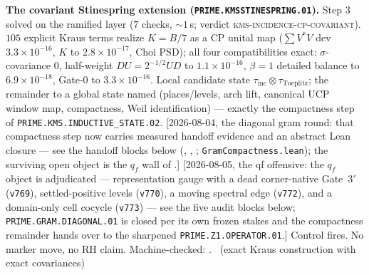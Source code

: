 \par\smallskip\noindent\textbf{The covariant Stinespring extension
(\texttt{PRIME.KMSSTINESPRING.01}).}
Step 3 solved on the ramified layer ($7$ checks, ${\sim}1$\,s;
verdict \textsc{kms-incidence-cp-covariant}).  $105$ explicit Kraus
terms realize $K=B/7$ as a CP unital map ($\sum V^*V$ dev
$3.3\times10^{-16}$, $K$ to $2.8\times10^{-17}$, Choi PSD); all
four compatibilities exact: $\sigma$-covariance $0$, half-weight
$DU=2^{-1/2}UD$ to $1.1\times10^{-16}$, $\beta=1$ detailed balance
to $6.9\times10^{-18}$, Gate-0 to $3.3\times10^{-16}$.  Local
candidate state
$\tau_{\mathrm{inc}}\otimes\tau_{\mathrm{Toeplitz}}$; the remainder
to a global state named (places/levels, arch lift, canonical UCP
window map, compactness, Weil identification) --- exactly the
compactness step of \texttt{PRIME.KMS.INDUCTIVE\_STATE.02}.
[2026-08-04, the diagonal gram round: that compactness step now
carries measured handoff evidence and an abstract Lean closure ---
see the handoff blocks below
(,
,
;
\texttt{GramCompactness.lean}); the surviving open object is the
$q_f$ wall of .]
[2026-08-05, the qf offensive: the $q_f$ object is adjudicated ---
representation gauge with a dead corner-native Gate~$3'$
(\texttt{v769}), settled-positive levels (\texttt{v770}), a moving
spectral edge (\texttt{v772}), and a domain-only cell cocycle
(\texttt{v773}) --- see the five audit blocks below;
\texttt{PRIME.GRAM.DIAGONAL.01} is closed per its own frozen
stakes and the compactness remainder hands over to the sharpened
\texttt{PRIME.Z1.OPERATOR.01}.]
Control fires.  No marker move, no RH claim.
Machine-checked: .
\mE\ (exact Kraus construction with exact covariances)
\par\smallskip



